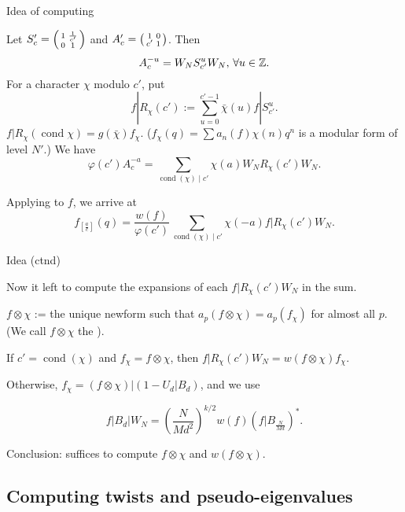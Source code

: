 \documentclass[handout]{beamer}
\DeclareMathOperator{\cond}{cond}
\begin{document}
\begin{frame}{Idea of computing}

Let $S_c' = \left( \begin{smallmatrix}1&\frac{1}{c'}\\0&1\end{smallmatrix}\right)$ and $A_c' = \left( \begin{smallmatrix}1&0\\c'&1\end{smallmatrix}\right)$.  Then 
\[
	A_c^{-u} = W_N S_{c'}^u W_N, \, \forall u \in \mathbb{Z}. 
\]
For a character $\chi$ modulo $c'$, put 
\begin{equation*}
\label{formula: RS}
	f | R_\chi(c') := \sum_{u =0}^{c'-1} \bar{\chi}(u) f | S_{c'}^u.
\end{equation*}
$f|R_\chi(\cond \chi) = g(\bar{\chi})f_\chi$. ($f_\chi (q) = \sum a_n(f) \chi(n)  q^n$ is a modular form of level $N'$.)   We have \begin{equation} 
\label{formula}
	\varphi(c') A_c^{-a} = \sum_{\cond(\chi) \mid c'} \chi(a) W_N R_\chi(c') W_N. 
\end{equation}

Applying to $f$, we arrive at
\begin{equation} \label{expansion0}
	\boxed{f_{[\frac{a}{c}]} \left( q\right) = \frac{w(f) }{\varphi(c')}\sum_{\cond(\chi) \mid c'} \chi(-a) f| R_\chi(c')  W_N}. 
\end{equation}
\end{frame}


\begin{frame}{Idea (ctnd)}

Now it left to compute the expansions of  each $f| R_\chi(c') W_N$ in the sum. 

$f \otimes \chi$ :=  the unique newform such that $a_p(f \otimes \chi) = a_p(f_\chi)$ for almost all $p$. 
(We call $f \otimes \chi$ the ).


If $c' = \cond(\chi)$ and $f_\chi = f \otimes \chi$, then  $f| R_\chi(c') W_N = w(f \otimes \chi) f_\chi$. 
\medskip

Otherwise, $f_\chi = (f \otimes \chi) | ( 1 - U_d | B_d)$, and we use 
\begin{Lemma} 
   $$f| B_d|W_N = \left(\frac{N}{Md^2} \right)^{k/2}  w(f)  (f|B_{\frac{N}{Md}})^{*}.$$
\end{Lemma} 

\medskip

Conclusion: suffices to compute $f \otimes \chi$ and $w(f \otimes \chi)$.

\end{frame}

\subsection{Computing twists and pseudo-eigenvalues}
\end{document}
